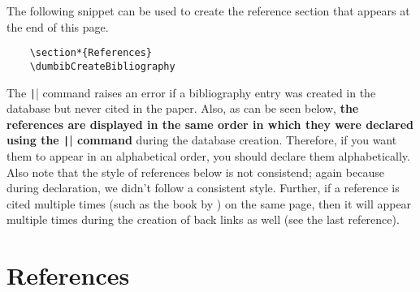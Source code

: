\documentclass[letter, 12pt]{article}
\begin{document}
  The following snippet can be used to create the reference section that appears at the end of this page.

  \begin{verbatim}
    \section*{References}
    \dumbibCreateBibliography
  \end{verbatim}

  The \texttt|\dumbibCreateBibliography| command raises an error if a bibliography entry was created in the database but never cited in the paper. Also, as can be seen below, \textbf{the references are displayed in the same order in which they were declared using the \texttt|\dumbibReferenceEntry{}| command} during the database creation. Therefore, if you want them to appear in an alphabetical order, you should declare them alphabetically. Also note that the style of references below is not consistend; again because during declaration, we didn't follow a consistent style. Further, if a reference is cited multiple times (such as the book by \cite*{talagrand2022}) on the same page, then it will appear multiple times during the creation of back links as well (see the last reference).

  \section*{References}
  \dumbibCreateBibliography
\end{document}
